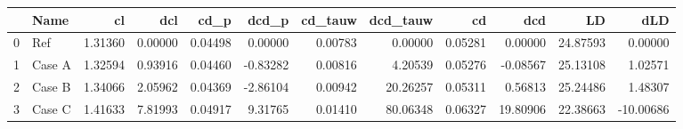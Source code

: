 \begin{tabular}{llrrrrrrrrrr}
\toprule
{} &    Name &      cl &     dcl &    cd\_p &    dcd\_p &  cd\_tauw &  dcd\_tauw &      cd &      dcd &       LD &       dLD \\
\midrule
0 &     Ref & 1.31360 & 0.00000 & 0.04498 &  0.00000 &  0.00783 &   0.00000 & 0.05281 &  0.00000 & 24.87593 &   0.00000 \\
1 &  Case A & 1.32594 & 0.93916 & 0.04460 & -0.83282 &  0.00816 &   4.20539 & 0.05276 & -0.08567 & 25.13108 &   1.02571 \\
2 &  Case B & 1.34066 & 2.05962 & 0.04369 & -2.86104 &  0.00942 &  20.26257 & 0.05311 &  0.56813 & 25.24486 &   1.48307 \\
3 &  Case C & 1.41633 & 7.81993 & 0.04917 &  9.31765 &  0.01410 &  80.06348 & 0.06327 & 19.80906 & 22.38663 & -10.00686 \\
\bottomrule
\end{tabular}
